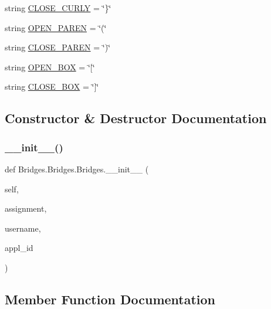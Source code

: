 \begin{DoxyCompactItemize}
string \mbox{\hyperlink{class_bridges_1_1_bridges_1_1_bridges_a460ec6a9b83237b9a44a09beea04a519}{C\+L\+O\+S\+E\+\_\+\+C\+U\+R\+LY}} = \char`\"{}\}\char`\"{}
\item 
string \mbox{\hyperlink{class_bridges_1_1_bridges_1_1_bridges_a0224c42589b48d2d24168b15a38735ad}{O\+P\+E\+N\+\_\+\+P\+A\+R\+EN}} = \char`\"{}(\char`\"{}
\item 
string \mbox{\hyperlink{class_bridges_1_1_bridges_1_1_bridges_afc31ec8269be6f57b1d2c1a1959c040f}{C\+L\+O\+S\+E\+\_\+\+P\+A\+R\+EN}} = \char`\"{})\char`\"{}
\item 
string \mbox{\hyperlink{class_bridges_1_1_bridges_1_1_bridges_ae94282f19974a947191a34c30865c202}{O\+P\+E\+N\+\_\+\+B\+OX}} = \char`\"{}\mbox{[}\char`\"{}
\item 
string \mbox{\hyperlink{class_bridges_1_1_bridges_1_1_bridges_abd16a70d55fbcf24b1a29536aae08c7b}{C\+L\+O\+S\+E\+\_\+\+B\+OX}} = \char`\"{}\mbox{]}\char`\"{}
\end{DoxyCompactItemize}


\subsection{Constructor \& Destructor Documentation}
\mbox{\label{class_bridges_1_1_bridges_1_1_bridges_ada234978079456870bf2212eaa1be938}} 
\subsubsection{\texorpdfstring{\+\_\+\+\_\+init\+\_\+\+\_\+()}{\_\_init\_\_()}}
{\footnotesize\ttfamily def Bridges.\+Bridges.\+Bridges.\+\_\+\+\_\+init\+\_\+\+\_\+ (\begin{DoxyParamCaption}\item[{}]{self,  }\item[{}]{assignment,  }\item[{}]{username,  }\item[{}]{appl\+\_\+id }\end{DoxyParamCaption})}



\subsection{Member Function Documentation}
\mbox{\label{class_bridges_1_1_bridges_1_1_bridges_a3c127f51ab4a4243c8a4893fa358f72f}} 
